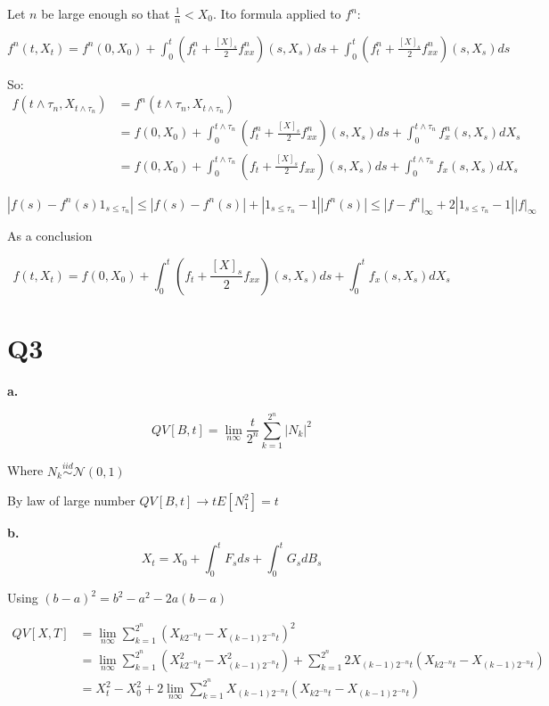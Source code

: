 \documentclass[11pt]{article}
\begin{document}
Let \(n\) be large enough so that \(\frac1n < X_0\). Ito formula applied to \(f^n\):

\(f^n(t, X_t) = f^n(0, X_0) + \int_0^t (f^n_t + \frac{[X]_s}2 f^n_{xx})(s, X_s) ds + \int_0^t (f^n_t + \frac{[X]_s}2 f^n_{xx})(s, X_s) ds\)

So:
\begin{align*}
f(t \wedge \tau_n, X_{t \wedge \tau_n})
&= f^n(t \wedge \tau_n, X_{t \wedge \tau_n})
\\&= f(0, X_0) + \int_0^{t\wedge \tau_n} (f^n_t + \frac{[X]_s}2 f^n_{xx})(s, X_s) ds + \int_0^{t\wedge \tau_n} f^n_{x}(s, X_s) dX_s
\\&= f(0, X_0) + \int_0^{t\wedge \tau_n} (f_t + \frac{[X]_s}2 f_{xx})(s, X_s) ds + \int_0^{t\wedge \tau_n} f_{x}(s, X_s) dX_s
\end{align*}


\(| f(s) - f^n(s)1_{s \le \tau_n}| \le |f(s) - f^n(s)| + |1_{s \le \tau_n} - 1| |f^n(s)| \le |f - f^n|_{\infty} + 2|1_{s \le \tau_n} - 1| |f|_{\infty}\)

As a conclusion

$$f(t, X_t)
  = f(0, X_0) + \int_0^t (f_t + \frac{[X]_s}2 f_{xx})(s, X_s) ds + \int_0^t  f_{x}(s, X_s) dX_s$$


\section{Q3}
\label{sec:orgheadline3}

\textbf{a.}

$$QV[B, t] = \lim_{n \infty} \frac{t}{2^n} \sum_{k=1}^{2^n} |N_k|^2$$

Where \(N_k \overset{iid}{\sim} \mathcal N(0, 1)\) 


By law of large number \(QV[B, t] \rightarrow t E[N_1^2] = t\)


\textbf{b.} 
$$X_t = X_0 + \int_0^t F_s ds + \int_0^t G_s dB_s$$

Using \((b-a)^2 = b^2 - a^2 - 2a(b-a)\)

\begin{align*}
QV[X, T]
&= \lim_{n \infty} \sum_{k=1}^{2^n} (X_{k2^{-n}t} - X_{(k-1)2^{-n}t})^2
\\&= \lim_{n \infty} \sum_{k=1}^{2^n} (X_{k2^{-n}t}^2 - X_{(k-1)2^{-n}t}^2) + \sum_{k=1}^{2^n} 2 X_{(k-1)2^{-n}t}(X_{k2^{-n}t} -  X_{(k-1)2^{-n}t})
\\&= X_t^2 - X_0^2  + 2 \lim_{n \infty} \sum_{k=1}^{2^n} X_{(k-1)2^{-n}t}(X_{k2^{-n}t} -  X_{(k-1)2^{-n}t})
\end{align*}
\end{document}
